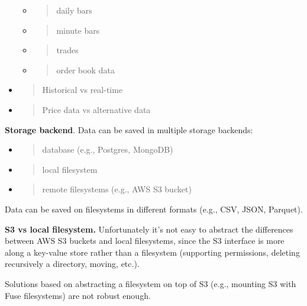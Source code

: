 \documentclass[11pt, reqno]{amsart}
\begin{document}
\begin{itemize}
  \begin{itemize}
  \item
    \begin{quote}
    daily bars
    \end{quote}
  \item
    \begin{quote}
    minute bars
    \end{quote}
  \item
    \begin{quote}
    trades
    \end{quote}
  \item
    \begin{quote}
    order book data
    \end{quote}
  \end{itemize}
\item
  \begin{quote}
  Historical vs real-time
  \end{quote}
\item
  \begin{quote}
  Price data vs alternative data
  \end{quote}
\end{itemize}

\textbf{Storage backend}. Data can be saved in multiple storage
backends:

\begin{itemize}
\item
  \begin{quote}
  database (e.g., Postgres, MongoDB)
  \end{quote}
\item
  \begin{quote}
  local filesystem
  \end{quote}
\item
  \begin{quote}
  remote filesystems (e.g., AWS S3 bucket)
  \end{quote}
\end{itemize}

Data can be saved on filesystems in different formats (e.g., CSV, JSON,
Parquet).

\textbf{S3 vs local filesystem.} Unfortunately it's not easy to abstract
the differences between AWS S3 buckets and local filesystems, since the
S3 interface is more along a key-value store rather than a filesystem
(supporting permissions, deleting recursively a directory, moving,
etc.).

Solutions based on abstracting a filesystem on top of S3 (e.g., mounting
S3 with Fuse filesystems) are not robust enough.
\end{document}
